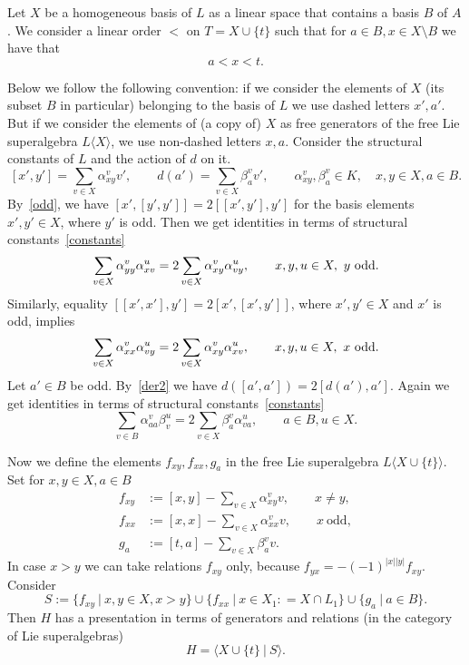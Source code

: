 \documentclass[12pt, reqno]{amsart}
\theoremstyle{remark}
\theoremstyle{definition}
\numberwithin{equation}{section}
\begin{document}
 Let $X$ be a homogeneous basis of $L$ as a linear space that contains a basis $B$ of $A$.
 We consider a linear order $< $ on $T = X \cup \{ t \}$ such that for $a \in B, x \in X \setminus B$ we have that
 $$a < x < t.$$ 
 
  
 Below we follow the following convention: 
 if we consider the elements of $X$ (its subset $B$ in particular) belonging to the basis of $L$
 we use dashed letters $x',a'$.
 But if we consider the elements of (a copy of) $X$ as free generators of the free Lie superalgebra  $L \langle X \rangle$,
 we use non-dashed letters $x,a$.
 Consider the structural constants of $L$ and the action of $d$ on it.
 \begin{equation}\label{constants}
 [x',y'] = \sum_{v \in X} \alpha_{xy}^v v', \qquad d(a') = \sum_{v \in X} \beta_a^v v', \qquad 
 \alpha_{xy}^v, \beta_a^v \in K,\quad  x,y \in X, a \in B.
 \end{equation}
 By~\eqref{odd}, we have $[x',[y',y']]= 2[[x',y'],y']$ for the basis elements $x',y'\in X$, where $y'$ is odd.
Then we get identities in terms of structural constants~\eqref{constants}
\begin{equation}\label{id_const}
\sum_{v\in X}\alpha_{yy}^v\alpha_{xv}^u=2 \sum_{v\in X} \alpha_{xy}^v\alpha_{vy}^u,\qquad
x,y,u\in X,\   y \hbox{ odd} .
\end{equation}
Similarly, equality  $[[x',x'],y']= 2[x',[x',y']]$, where $x',y'\in X$ and $x'$ is odd, implies
\begin{equation}\label{id_const2}
\sum_{v\in X}\alpha_{xx}^v\alpha_{vy}^u=2 \sum_{v\in X} \alpha_{xy}^v\alpha_{xv}^u,\qquad
x,y,u\in X,\  x \hbox{ odd} .
\end{equation}
Let $a'\in B$ be odd. By~\eqref{der2} we have $d([a',a'])=2[d(a'),a']$.
Again we get identities in terms of  structural constants~\eqref{constants}
\begin{equation}\label{id_const3}
\sum_{v\in B}\alpha_{aa}^v\beta_{v}^u =2 \sum_{v\in X} \beta_{a}^v\alpha_{va}^u,\qquad
a\in B,u\in X.
\end{equation}

\noindent
 Now we define the elements  $f_{xy}, f_{xx}, g_a$ in the free Lie superalgebra  $L\langle X \cup \{ t \} \rangle$.
 Set for $x,y \in X, a \in B$
 \begin{align*}
 f_{xy} &  := [x,y] - \sum_{v \in X} \alpha_{xy}^v v,\qquad x \not= y, \\ 
 f_{xx} &  :=  [x,x] - \sum_{v \in X} \alpha_{xx}^v v,\qquad x\  \text{odd},\\ 
 g_a    &  := [t,a] - \sum_{v \in X} \beta_a^v v. 
 \end{align*}
In case $x>y$ we can take relations $f_{xy}$ only, because $f_{yx}=-(-1)^{|x||y|} f_{xy}$.
Consider
\begin{equation}\label{setS}
 S := \{ f_{xy} \ | \ x,y \in X, x > y \} \cup \{ f_{xx} \ | \ x \in X_1: = X \cap L_{1} \} \cup \{ g_a \ | \ a \in B \}.
\end{equation} 
Then $H$ has a presentation in terms of generators and relations (in the category of Lie superalgebras)
\begin{equation}\label{HNN}
 H = \langle X \cup \{ t \} \ | \ S \rangle.
\end{equation}
\end{document}
